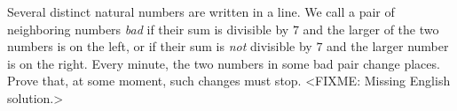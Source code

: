 \problem{}
Several distinct natural numbers are written in a line.
We call a pair of neighboring numbers \emph{bad} if their sum
is divisible by $7$ and the larger of the two numbers is on the left,
or if their sum is \emph{not} divisible by $7$ and the larger number
is on the right.
Every minute, the two numbers in some bad pair change places.
Prove that, at some moment, such changes must stop.
\solution
<FIXME: Missing English solution.>
\endproblem
